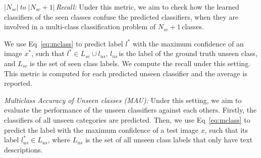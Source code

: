 
\textit{\small$|N_{sc}|\,$\normalsize to \small$|N_{sc}+1|\,$\normalsize Recall:}
Under this metric, we aim to check  how   the learned classifiers of the seen classes confuse the predicted classifiers, when they are involved in a multi-class classification problem of \small$N_{sc} + 1\,$\normalsize classes. We use Eq~\ref{eq:mclass} to predict label $l^*$  with the maximum confidence of an image \small$x^*$\normalsize, such that \small$l^* \in {L}_{sc} \cup l_{us}$\normalsize,  \small$l_{us}\,$\normalsize is the label of the ground truth unseen class, and ${L}_{sc}$ is the set of seen class labels. We compute the recall under this setting. This metric is computed for each predicted unseen classifier and the average is reported.

\textit{Multiclass Accuracy of Unseen classes (MAU):} Under this setting, we aim to evaluate the performance of  the unseen  classifiers against each others. Firstly, the classifiers of all unseen categories are predicted. Then, we use Eq~\ref{eq:mclass} to predict the label with the maximum confidence of a test image $x$, such that its label $l_{us}^* \in {L}_{us}$, where ${L}_{us}$ is the set of all unseen class labels that only have text descriptions. 




